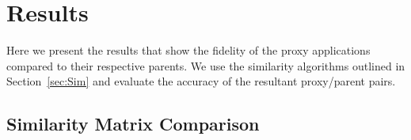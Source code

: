 \section{Results}
\label{sec:results}
Here we present the results that show the fidelity of the proxy applications compared to their respective parents.
We use the similarity algorithms outlined in Section~\ref{sec:Sim} and evaluate the accuracy of the resultant proxy/parent pairs.   

\subsection{Similarity Matrix Comparison}
\label{sec:SimCom}

